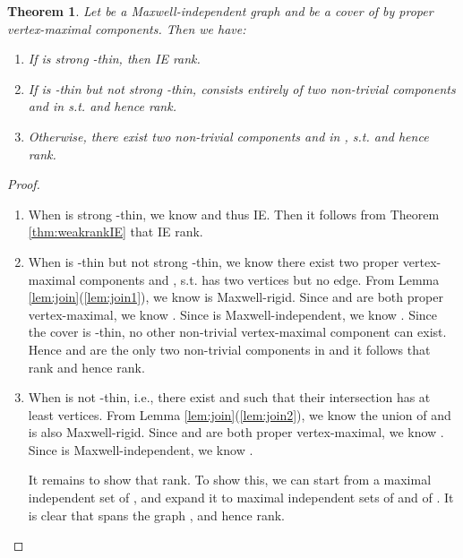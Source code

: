 \documentclass[10pt]{article}
\newtheorem{thm}{Theorem}
\begin{document}
\begin{thm}\label{thm:propermaximal}
Let  be a Maxwell-independent graph and     be a cover of  by proper vertex-maximal components. Then we have:
\begin{enumerate}
\item If  is strong -thin, then       IE  rank.
\item If  is -thin but not strong -thin,  consists entirely of two non-trivial components  and  in  s.t.      and hence       rank.
\item Otherwise, there exist two non-trivial components  and  in , s.t.      and hence       rank.
\end{enumerate}

\end{thm}
\begin{proof}
\begin{enumerate}
\item When  is strong -thin, we know    and thus       IE. Then it follows from Theorem \ref{thm:weakrankIE} that IE  rank.

\item When  is -thin but not strong -thin, we know there exist two proper vertex-maximal components  and , s.t.    has two vertices but no edge. From Lemma \ref{lem:join}(\ref{lem:join1}), we know    is Maxwell-rigid. Since  and  are both proper vertex-maximal, we know     . Since  is Maxwell-independent, we know     . Since the cover is -thin, no other non-trivial vertex-maximal component can exist. Hence  and  are the only two non-trivial components in  and it follows that rank    and hence        rank.




\item When  is not -thin, i.e., there exist  and  such that their intersection has at least  vertices. From Lemma \ref{lem:join}(\ref{lem:join2}), we know the union of  and  is also Maxwell-rigid. Since  and  are both proper vertex-maximal, we know     . Since  is Maxwell-independent, we know     .

It remains to show that       rank. To show this, we can start from a maximal independent set  of   , and expand it to maximal independent sets  of  and  of . It is clear that  spans the graph   , and hence         rank.




\end{enumerate}


\end{proof}
\end{document}
